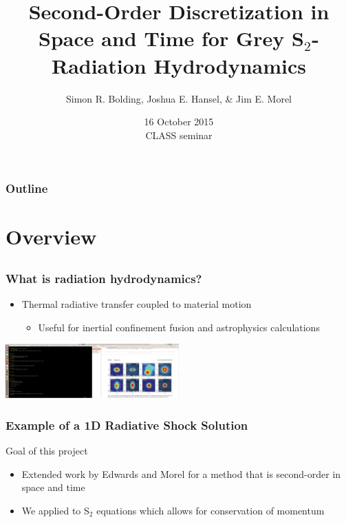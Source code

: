 \documentclass[xcolor=dvipsnames]{beamer}
\title{Second-Order Discretization in Space and Time for Grey S$_2$-Radiation Hydrodynamics}
\author{{\large Simon R. Bolding, Joshua E. Hansel, \& Jim E. Morel}}
\date{16 October 2015 \\ \vspace{0.05in} {CLASS seminar}}
\newcommand{\colb}[1]{{\color{blue} #1}}
\newlength{\wideitemsep}
\let\olditem\item
\renewcommand{\item}{\setlength{\itemsep}{\wideitemsep}\olditem}
\begin{document}
\begin{frame}
    \titlepage \vspace{-0.213in}
    \begin{center}
    \end{center}    
\end{frame}

\setlength{\tabcolsep}{6pt}

\begin{frame}
\frametitle{Outline}
\begin{minipage}{0.061\linewidth}
\hfill                      
\end{minipage}
\begin{minipage}{0.8\linewidth}
\tableofcontents[
hideothersubsections,
sectionstyle=show,
subsectionstyle=hide
]
\end{minipage}

\end{frame}


\section{Overview}
\subsection{}

\begin{frame}
    \frametitle{What is radiation hydrodynamics?}
    \begin{itemize}
        \item Thermal radiative transfer coupled to material motion
            \begin{itemize}
                \item Useful for inertial confinement fusion and astrophysics calculations
            \end{itemize}
    \end{itemize}
        \includegraphics[width=0.5\textwidth,trim=28in 2in 6in 5in,clip]{nif.png}
\end{frame}

\begin{frame}
    \frametitle{Example of a 1D Radiative Shock Solution}
    \begin{block}{Goal of this project}
        \begin{itemize}
            \item
     Extended work by Edwards and Morel for a method that is second-order in
     \colb{space} and \colb{time}
 \item We applied to S$_2$ equations which allows for conservation of momentum 
     \end{itemize}
 \end{block}
\end{frame}
\end{document}
